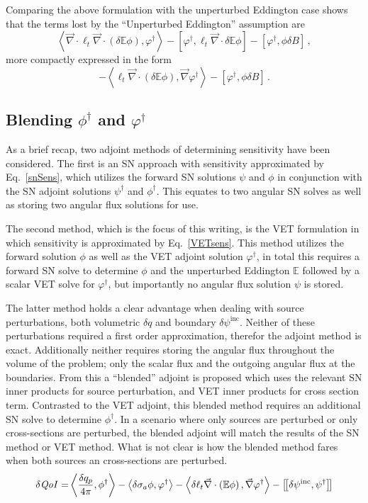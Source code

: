 \documentclass[12pt]{report}
\newcommand{\bra}{\left\langle}
\newcommand{\ket}{\right\rangle}
\newcommand{\sbraSN}{\left[ \! \left[}
\newcommand{\sketSN}{\right] \! \right]}
\newcommand{\sbra}{\left[}
\newcommand{\sket}{\right]}
\renewcommand{\div}{\vec{\nabla} \cdot}
\newcommand{\grad}{\vec{\nabla}}
\newcommand{\vefadj}{\varphi^\dag}
\newcommand{\Edd}{\mathbb{E}}
\newcommand{\BEdd}{B}
\newcommand{\siga}{\sigma_a}
\newcommand{\isigt}{\ell_t}
\newcommand{\angSourced}{\frac{\delta q_p}{4 \pi}}
\newcommand{\qoi}{{\it QoI}\xspace}
\begin{document}
Comparing the above formulation with the unperturbed Eddington case shows that the terms lost by the ``Unperturbed Eddington'' assumption are 
\begin{equation}
\label{EddErrLong}
 \bra \div \isigt \div \left( \delta \Edd \phi \right), \vefadj \ket
- \sbra  \vefadj ,\isigt \div \delta \Edd \phi \sket
- \sbra \vefadj, \phi \delta \BEdd \sket \,,
\end{equation} 
more compactly expressed in the form
\begin{equation}
\label{EddErr}
 - \bra  \isigt \div \left( \delta \Edd \phi \right), \grad \vefadj \ket
- \sbra \vefadj, \phi \delta \BEdd \sket \,.
\end{equation} 


\subsection{Blending $\phi^\dag$ and $\varphi^\dag$}
As a brief recap, two adjoint methods of determining sensitivity have been considered. The first is an SN approach with sensitivity approximated by Eq.~\eqref{snSens}, which utilizes the forward SN solutions $\psi$ and $\phi$ in conjunction with the SN adjoint solutions $\psi^\dag$ and $\phi^\dag$. This equates to two angular SN solves as well as storing two angular flux solutions for use. 

The second method, which is the focus of this writing, is the VET formulation in which sensitivity is approximated by Eq.~\eqref{VETsens}. This method utilizes the forward solution $\phi$ as well as the VET adjoint solution $\vefadj$, in total this requires a forward SN solve to determine $\phi$ and the unperturbed Eddington $\Edd$ followed by a scalar VET solve for $\vefadj$, but importantly no angular flux solution $\psi$ is stored.

The latter method holds a clear advantage when dealing with source perturbations, both volumetric $\delta q$ and boundary $\delta \psi^\text{inc}$. Neither of these perturbations required a first order approximation, therefor the adjoint method is exact. Additionally neither requires storing the angular flux throughout the volume of the problem; only the scalar flux and the outgoing angular flux at the boundaries. From this a ``blended'' adjoint is proposed which uses the relevant SN inner products for source perturbation, and VET inner products for cross section term. Contrasted to the VET adjoint, this blended method requires an additional SN solve to determine $\phi^\dag$. In a scenario where only sources are perturbed or only cross-sections are perturbed, the blended adjoint will match the results of the SN method or VET method. What is not clear is how the blended method fares when both sources an cross-sections are perturbed.
\begin{equation}
\label{Blendsens}
\begin{split}
\delta \qoi =&  \bra \angSourced , \phi^\dag \ket - \bra \delta \siga \phi, \vefadj \ket - \bra \delta \isigt \div \left( \Edd \phi \right) , \grad \vefadj \ket
- \sbraSN \delta \psi^\text{inc}, \psi^\dag \sketSN \\
\end{split}
\end{equation}
\end{document}

